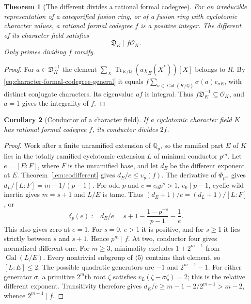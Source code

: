\documentclass[11pt,a4paper]{article}
\numberwithin{equation}{section}
\newtheorem{theorem}{Theorem}[section]
\newtheorem{corollary}[theorem]{Corollary}
\theoremstyle{remark}
\newcommand{\Gal}{\operatorname{Gal}}
\newcommand{\QQ}{\mathbb Q}
\newcommand{\Tr}{\operatorname{Tr}}
\begin{document}
\begin{theorem}[The different divides a rational formal codegree]\label{fam:M:2.5}\label{lem:codifferent}
For an irreducible representation of a categorified fusion ring, or of a fusion ring with cyclotomic character values, a rational formal codegree $f$ is a positive integer. The different of its character field satisfies
\begin{equation}\label{eq:character-different-divisibility}
 \mathfrak D_K\mid f\mathcal O_K .
\end{equation}
Only primes dividing $f$ ramify.
\end{theorem}
\begin{proof}
For $a\in\mathfrak D_K^{-1}$ the element $\sum_X\Tr_{K/\QQ}(a\chi_E(X^*))[X]$ belongs to $R$. By \eqref{eq:character-formal-codegree-general} it equals
$f\sum_{\sigma\in\Gal(K/\QQ)}\sigma(a)e_{\sigma E}$, with distinct conjugate characters. Its eigenvalue $af$ is integral. Thus $f\mathfrak D_K^{-1}\subseteq\mathcal O_K$, and $a=1$ gives the integrality of $f$.

\end{proof}
\begin{corollary}[Conductor of a character field]\label{fam:M:2.6}\label{cor:field-conductor}
If a cyclotomic character field $K$ has rational formal codegree $f$,
its conductor divides $2f$.
\end{corollary}
\begin{proof}
Work after a finite unramified extension of $\QQ_p$, so the ramified
part $E$ of $K$ lies in the totally ramified cyclotomic extension
$L$ of minimal conductor $p^m$. Let $e=[E:F]$, where $F$ is the
unramified base, and let $d_E$ be the different exponent at $E$.
Theorem~\ref{lem:codifferent} gives $d_E/e\le v_p(f)$.
The derivative of $\Phi_{p^m}$ gives
$d_L/[L:F]=m-1/(p-1)$.
For odd $p$ and $e=e_0p^s>1$, $e_0\mid p-1$, cyclic wild inertia
gives $m=s+1$ and $L/E$ is tame. Thus
$(d_E+1)/e=(d_L+1)/[L:F]$, or
\begin{equation}\label{eq:odd-normalized-different}
 \delta_p(e):=d_E/e=s+1-\frac{1-p^{-s}}{p-1}-\frac1e .
\end{equation}
This also gives zero at $e=1$. For $s=0$, $e>1$ it is positive,
and for $s\ge1$ it lies strictly between $s$ and $s+1$.
Hence $p^m\mid f$.
At two, conductor four gives normalized different one.
For $m\ge3$, minimality excludes $1+2^{m-1}$ from
$\Gal(L/E)$. Every nontrivial subgroup of $\langle5\rangle$
contains that element, so $[L:E]\le2$. The possible quadratic
generators are $-1$ and $2^{m-1}-1$. For either generator $\sigma$,
a primitive $2^m$th root $\zeta$ satisfies
$v_L(\zeta-\sigma\zeta)=2$; this is the relative different exponent.
Transitivity therefore gives
$d_E/e\ge m-1-2/2^{m-1}>m-2$, whence $2^{m-1}\mid f$.
\end{proof}
\end{document}
